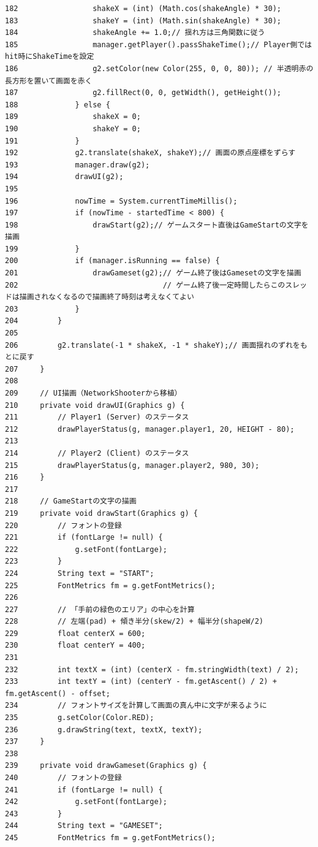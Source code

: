 \documentclass[11pt,a4j]{jarticle}
\begin{document}
\begin{small}
\begin{verbatim}
182                 shakeX = (int) (Math.cos(shakeAngle) * 30);
183                 shakeY = (int) (Math.sin(shakeAngle) * 30);
184                 shakeAngle += 1.0;// 揺れ方は三角関数に従う
185                 manager.getPlayer().passShakeTime();// Player側ではhit時にShakeTimeを設定
186                 g2.setColor(new Color(255, 0, 0, 80)); // 半透明赤の長方形を置いて画面を赤く
187                 g2.fillRect(0, 0, getWidth(), getHeight());
188             } else {
189                 shakeX = 0;
190                 shakeY = 0;
191             }
192             g2.translate(shakeX, shakeY);// 画面の原点座標をずらす
193             manager.draw(g2);
194             drawUI(g2);
195 
196             nowTime = System.currentTimeMillis();
197             if (nowTime - startedTime < 800) {
198                 drawStart(g2);// ゲームスタート直後はGameStartの文字を描画
199             }
200             if (manager.isRunning == false) {
201                 drawGameset(g2);// ゲーム終了後はGamesetの文字を描画
202                                 // ゲーム終了後一定時間したらこのスレッドは描画されなくなるので描画終了時刻は考えなくてよい
203             }
204         }
205 
206         g2.translate(-1 * shakeX, -1 * shakeY);// 画面揺れのずれをもとに戻す
207     }
208 
209     // UI描画（NetworkShooterから移植）
210     private void drawUI(Graphics g) {
211         // Player1 (Server) のステータス
212         drawPlayerStatus(g, manager.player1, 20, HEIGHT - 80);
213 
214         // Player2 (Client) のステータス
215         drawPlayerStatus(g, manager.player2, 980, 30);
216     }
217 
218     // GameStartの文字の描画
219     private void drawStart(Graphics g) {
220         // フォントの登録
221         if (fontLarge != null) {
222             g.setFont(fontLarge);
223         }
224         String text = "START";
225         FontMetrics fm = g.getFontMetrics();
226 
227         // 「手前の緑色のエリア」の中心を計算
228         // 左端(pad) + 傾き半分(skew/2) + 幅半分(shapeW/2)
229         float centerX = 600;
230         float centerY = 400;
231 
232         int textX = (int) (centerX - fm.stringWidth(text) / 2);
233         int textY = (int) (centerY - fm.getAscent() / 2) + fm.getAscent() - offset;
234         // フォントサイズを計算して画面の真ん中に文字が来るように
235         g.setColor(Color.RED);
236         g.drawString(text, textX, textY);
237     }
238 
239     private void drawGameset(Graphics g) {
240         // フォントの登録
241         if (fontLarge != null) {
242             g.setFont(fontLarge);
243         }
244         String text = "GAMESET";
245         FontMetrics fm = g.getFontMetrics();

\end{verbatim}
\end{small}
\end{document}
